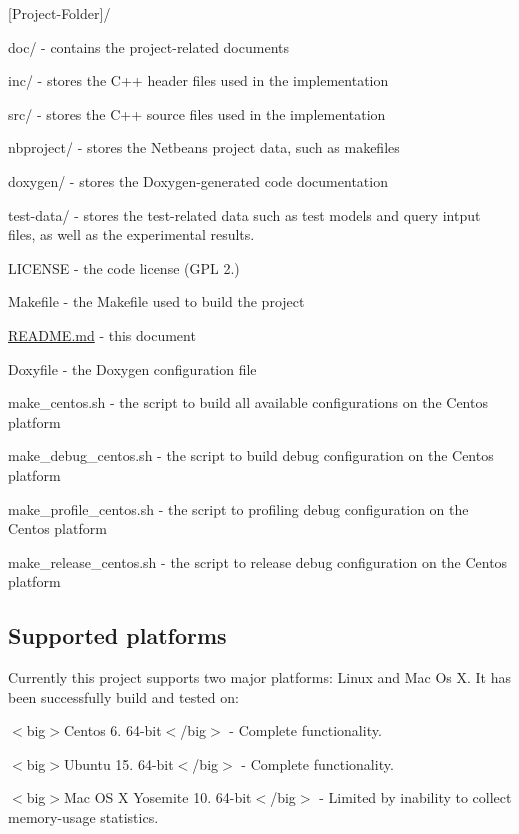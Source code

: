 \begin{DoxyItemize}
\item \mbox{[}Project-\/\+Folder\mbox{]}/
\begin{DoxyItemize}
\item doc/ -\/ contains the project-\/related documents
\item inc/ -\/ stores the C++ header files used in the implementation
\item src/ -\/ stores the C++ source files used in the implementation
\item nbproject/ -\/ stores the Netbeans project data, such as makefiles
\item doxygen/ -\/ stores the Doxygen-\/generated code documentation
\item test-\/data/ -\/ stores the test-\/related data such as test models and query intput files, as well as the experimental results.
\item L\+I\+C\+E\+N\+S\+E -\/ the code license (G\+P\+L 2.)
\item Makefile -\/ the Makefile used to build the project
\item \hyperlink{_r_e_a_d_m_e_8md}{R\+E\+A\+D\+M\+E.\+md} -\/ this document
\item Doxyfile -\/ the Doxygen configuration file
\item make\+\_\+centos.\+sh -\/ the script to build all available configurations on the Centos platform
\item make\+\_\+debug\+\_\+centos.\+sh -\/ the script to build debug configuration on the Centos platform
\item make\+\_\+profile\+\_\+centos.\+sh -\/ the script to profiling debug configuration on the Centos platform
\item make\+\_\+release\+\_\+centos.\+sh -\/ the script to release debug configuration on the Centos platform
\end{DoxyItemize}
\end{DoxyItemize}

\subsection*{Supported platforms}

Currently this project supports two major platforms\+: Linux and Mac Os X. It has been successfully build and tested on\+:


\begin{DoxyItemize}
\item $<$big$>$Centos 6. 64-\/bit$<$/big$>$ -\/ Complete functionality.
\item $<$big$>$Ubuntu 15. 64-\/bit$<$/big$>$ -\/ Complete functionality.
\item $<$big$>$Mac O\+S X Yosemite 10. 64-\/bit$<$/big$>$ -\/ Limited by inability to collect memory-\/usage statistics.
\end{DoxyItemize}

